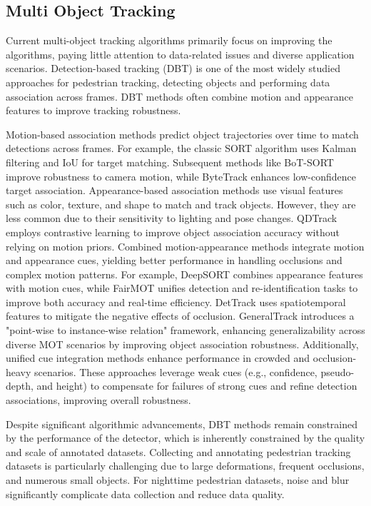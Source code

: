 \subsection{Multi Object Tracking}
Current multi-object tracking algorithms primarily focus on improving the algorithms, paying little attention to data-related issues and diverse application scenarios. Detection-based tracking (DBT) is one of the most widely studied approaches for pedestrian tracking, detecting objects and performing data association across frames. DBT methods often combine motion and appearance features to improve tracking robustness.

Motion-based association methods predict object trajectories over time to match detections across frames. For example, the classic SORT\cite{bewley2016simple} algorithm uses Kalman filtering and IoU for target matching. Subsequent methods like BoT-SORT\cite{aharon2022bot} improve robustness to camera motion, while ByteTrack\cite{zhang2022bytetrack} enhances low-confidence target association.
Appearance-based association methods use visual features such as color, texture, and shape to match and track objects. However, they are less common due to their sensitivity to lighting and pose changes. QDTrack\cite{fischer2023qdtrack} employs contrastive learning to improve object association accuracy without relying on motion priors.
Combined motion-appearance methods integrate motion and appearance cues, yielding better performance in handling occlusions and complex motion patterns\cite{rajapaksha2024consistency}. For example, DeepSORT\cite{wojke2017simple} combines appearance features with motion cues, while FairMOT\cite{zhang2021fairmot} unifies detection and re-identification tasks to improve both accuracy and real-time efficiency. DetTrack\cite{gao2023dettrack} uses spatiotemporal features to mitigate the negative effects of occlusion. GeneralTrack\cite{qin2024towards} introduces a "point-wise to instance-wise relation" framework, enhancing generalizability across diverse MOT scenarios by improving object association robustness.
Additionally, unified cue integration methods\cite{li2025unisort} enhance performance in crowded and occlusion-heavy scenarios. These approaches leverage weak cues (e.g., confidence, pseudo-depth, and height) to compensate for failures of strong cues and refine detection associations, improving overall robustness.

Despite significant algorithmic advancements, DBT methods remain constrained by the performance of the detector, which is inherently constrained by the quality and scale of annotated datasets. Collecting and annotating pedestrian tracking datasets is particularly challenging due to large deformations, frequent occlusions, and numerous small objects. For nighttime pedestrian datasets, noise and blur significantly complicate data collection and reduce data quality.

